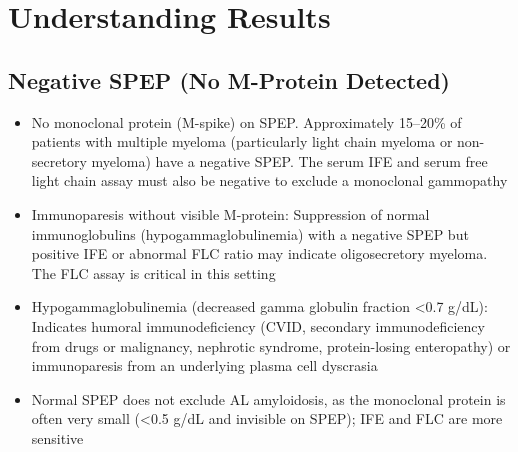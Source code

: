 \section*{Understanding Results}

\subsection*{Negative SPEP (No M-Protein Detected)}
\begin{itemize}
  \item No monoclonal protein (M-spike) on SPEP. Approximately 15--20\% of patients with multiple myeloma (particularly light chain myeloma or non-secretory myeloma) have a negative SPEP. The serum IFE and serum free light chain assay must also be negative to exclude a monoclonal gammopathy
  \item Immunoparesis without visible M-protein: Suppression of normal immunoglobulins (hypogammaglobulinemia) with a negative SPEP but positive IFE or abnormal FLC ratio may indicate oligosecretory myeloma. The FLC assay is critical in this setting
  \item Hypogammaglobulinemia (decreased gamma globulin fraction <0.7 g/dL): Indicates humoral immunodeficiency (CVID, secondary immunodeficiency from drugs or malignancy, nephrotic syndrome, protein-losing enteropathy) or immunoparesis from an underlying plasma cell dyscrasia
  \item Normal SPEP does not exclude AL amyloidosis, as the monoclonal protein is often very small (<0.5 g/dL and invisible on SPEP); IFE and FLC are more sensitive
\end{itemize}

